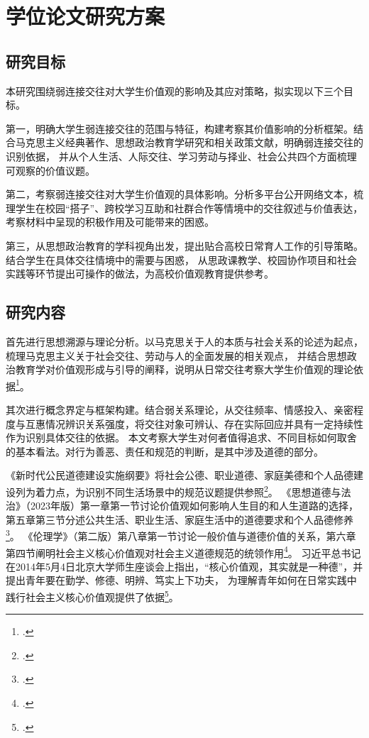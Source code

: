 \section{学位论文研究方案}

\subsection{研究目标}

本研究围绕弱连接交往对大学生价值观的影响及其应对策略，拟实现以下三个目标。

第一，明确大学生弱连接交往的范围与特征，构建考察其价值影响的分析框架。结合马克思主义经典著作、思想政治教育学研究和相关政策文献，明确弱连接交往的识别依据，
并从个人生活、人际交往、学习劳动与择业、社会公共四个方面梳理可观察的价值议题。

第二，考察弱连接交往对大学生价值观的具体影响。分析多平台公开网络文本，梳理学生在校园“搭子”、跨校学习互助和社群合作等情境中的交往叙述与价值表达，
考察材料中呈现的积极作用及可能带来的困惑。

第三，从思想政治教育的学科视角出发，提出贴合高校日常育人工作的引导策略。结合学生在具体交往情境中的需要与困惑，
从思政课教学、校园协作项目和社会实践等环节提出可操作的做法，为高校价值观教育提供参考。

\subsection{研究内容}

首先进行思想溯源与理论分析。以马克思关于人的本质与社会关系的论述为起点，梳理马克思主义关于社会交往、劳动与人的全面发展的相关观点，
并结合思想政治教育学对价值观形成与引导的阐释，说明从日常交往考察大学生价值观的理论依据\footcite{MarxEngels2009,sizheng2018}。

其次进行概念界定与框架构建。结合弱关系理论，从交往频率、情感投入、亲密程度与互惠情况辨识关系强度，将交往对象可辨认、存在实际回应并具有一定持续性作为识别具体交往的依据。
本文考察大学生对何者值得追求、不同目标如何取舍的基本看法。对行为善恶、责任和规范的判断，是其中涉及道德的部分。

《新时代公民道德建设实施纲要》将社会公德、职业道德、家庭美德和个人品德建设列为着力点，为识别不同生活场景中的规范议题提供参照\footcite{gangyao2019}。
《思想道德与法治》（2023年版）第一章第一节讨论价值观如何影响人生目的和人生道路的选择，
第五章第三节分述公共生活、职业生活、家庭生活中的道德要求和个人品德修养\footcite{sixiangdaode2023}。
《伦理学》（第二版）第八章第一节讨论一般价值与道德价值的关系，第六章第四节阐明社会主义核心价值观对社会主义道德规范的统领作用\footcite{lunlixue2020}。
习近平总书记在2014年5月4日北京大学师生座谈会上指出，“核心价值观，其实就是一种德”，并提出青年要在勤学、修德、明辨、笃实上下功夫，
为理解青年如何在日常实践中践行社会主义核心价值观提供了依据\footcite{Xi2014}。

